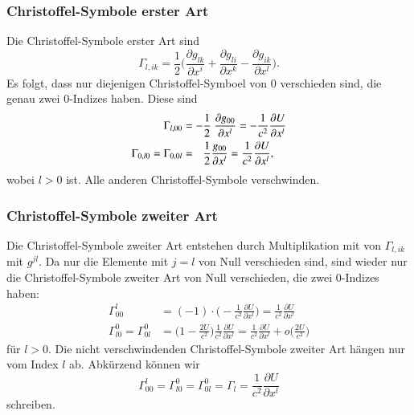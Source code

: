 %
%
\subsubsection{Christoffel-Symbole erster Art}
Die Christoffel-Symbole erster Art sind
\[
\Gamma_{l,ik}
=
\frac{1}{2}\biggl(
\frac{\partial g_{lk}}{\partial x^i}
+
\frac{\partial g_{li}}{\partial x^k}
-
\frac{\partial g_{ik}}{\partial x^l}
\biggr).
\]
Es folgt, dass nur diejenigen Christoffel-Symboel von $0$ verschieden
sind, die genau zwei $0$-Indizes haben.
Diese sind
\begin{align}
\Gamma_{l,00}
&=
-\frac12 \frac{\partial g_{00}}{\partial x^l}
=
-
\frac{1}{c^2}\frac{\partial U}{\partial x^l}
\notag
\\
\Gamma_{0,l0}
=
\Gamma_{0,0l}
&=
\phantom{-}
\frac{1}{2}\frac{g_{00}}{\partial x^l}
=
\frac{1}{c^2}\frac{\partial U}{\partial x^l},
\label{buch:kruemmung:newton:eqn:bewegungsgleichung}
\end{align}
wobei $l>0$ ist.
Alle anderen Christoffel-Symbole verschwinden.

%
%
\subsubsection{Christoffel-Symbole zweiter Art}
Die Christoffel-Symbole zweiter Art entstehen durch Multiplikation
mit von $\Gamma_{l,ik}$ mit $g^{jl}$.
Da nur die Elemente mit $j=l$ von Null verschieden sind, sind wieder
nur die Christoffel-Symbole zweiter Art von Null verschieden, die zwei
$0$-Indizes haben:
\begin{align*}
\Gamma^l_{00}
&=
(-1)\cdot\biggl(-\frac{1}{c^2}\frac{\partial U}{\partial x^l}\biggr)
=
\frac{1}{c^2}\frac{\partial U}{\partial x^l}
\\
\Gamma^0_{l0}
=
\Gamma^0_{0l}
&=
\biggl(1-\frac{2U}{c^2}\biggr)
\frac{1}{c^2}\frac{\partial U}{\partial x^l}
=
\frac{1}{c^2}\frac{\partial U}{\partial x^l}
+
o\biggl(
\frac{2U}{c^2}
\biggr)
\end{align*}
für $l>0$.
Die nicht verschwindenden Christoffel-Symbole zweiter Art hängen nur
vom Index $l$ ab.
Abkürzend können wir
\[
\Gamma^l_{00}
=
\Gamma^0_{l0}
=
\Gamma^0_{0l}
=
\Gamma_l
= 
\frac{1}{c^2} \frac{\partial U}{\partial x^l}
\]
schreiben.

%
%
